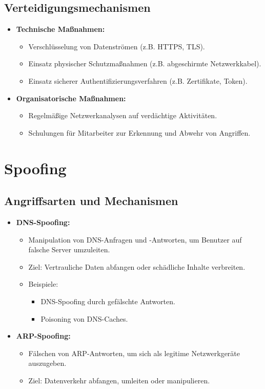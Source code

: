 \documentclass{article}
\begin{document}
\subsection{Verteidigungsmechanismen}
\begin{itemize}
    \item \textbf{Technische Maßnahmen:}
    \begin{itemize}
        \item Verschlüsselung von Datenströmen (z.B. HTTPS, TLS).
        \item Einsatz physischer Schutzmaßnahmen (z.B. abgeschirmte Netzwerkkabel).
        \item Einsatz sicherer Authentifizierungsverfahren (z.B. Zertifikate, Token).
    \end{itemize}
    \item \textbf{Organisatorische Maßnahmen:}
    \begin{itemize}
        \item Regelmäßige Netzwerkanalysen auf verdächtige Aktivitäten.
        \item Schulungen für Mitarbeiter zur Erkennung und Abwehr von Angriffen.
    \end{itemize}
\end{itemize}


\section{Spoofing}

\subsection{Angriffsarten und Mechanismen}
\begin{itemize}
    \item \textbf{DNS-Spoofing:}
    \begin{itemize}
        \item Manipulation von DNS-Anfragen und -Antworten, um Benutzer auf falsche Server umzuleiten.
        \item Ziel: Vertrauliche Daten abfangen oder schädliche Inhalte verbreiten.
        \item Beispiele:
        \begin{itemize}
            \item DNS-Spoofing durch gefälschte Antworten.
            \item Poisoning von DNS-Caches.
        \end{itemize}
    \end{itemize}
    \item \textbf{ARP-Spoofing:}
    \begin{itemize}
        \item Fälschen von ARP-Antworten, um sich als legitime Netzwerkgeräte auszugeben.
        \item Ziel: Datenverkehr abfangen, umleiten oder manipulieren.
    \end{itemize}
\end{itemize}
\end{document}

